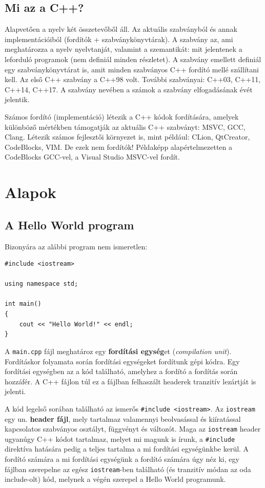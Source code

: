 \documentclass[a4paper,11.5pt,table]{article}
\begin{document}
	\subsection{Mi az a C++?}
	Alapvetően a nyelv két összetevőből áll. Az aktuális szabványból és annak implementációiból (fordítók + szabványkönyvtárak). A szabvány az, ami meghatározza a nyelv nyelvtanját, valamint a szemantikát: mit jelentenek a leforduló programok (nem definiál minden részletet). A szabvány emellett definiál egy szabványkönyvtárat is, amit minden szabványos C++ fordító mellé szállítani kell. Az első C++ szabvány a {C++98} volt. További szabványai: {C++03}, {C++11}, {C++14}, {C++17}. A szabvány nevében a számok a szabvány elfogadásának évét jelentik. 
	
	\medskip
	Számos fordító (implementáció) létezik a C++ kódok fordítására, amelyek különböző mértékben támogatják az aktuális C++ szabványt: MSVC, GCC, Clang.
	Létezik számos fejlesztői környezet is, mint például: CLion, QtCreator, CodeBlocks, VIM. De ezek nem fordítók! Példaképp alapértelmezetten a CodeBlocks GCC-vel, a Visual Studio MSVC-vel fordít.


	\section{Alapok}

	\subsection{A Hello World program}
	Bizonyára az alábbi program nem ismeretlen:
	
	\medskip
	
	\begin{lstlisting}
#include <iostream>

using namespace std;
	
int main()
{
	cout << "Hello World!" << endl;
}
	\end{lstlisting}
	A \texttt{main.cpp} fájl meghatároz egy \textbf{fordítási egység}et (\textit{compilation unit}). Fordításkor folyamata során fordítási egységeket fordítunk gépi kódra. Egy fordítási egységben az a kód található, amelyhez a fordító a fordítás során hozzáfér. A C++ fájlon túl ez a fájlban felhaszált headerek tranzitív lezártját is jelenti.
	
	\medskip
	A kód legelső sorában található az ismerős \texttt{\#include <iostream>}. Az \texttt{iostream} egy un. \textbf{header fájl}, mely tartalmaz valamennyi beolvasással és kiíratással kapcsolatos szabványos osztályt, függvényt és változót. Maga az \texttt{iostream} header ugyanúgy C++ kódot tartalmaz, melyet mi magunk is írunk, a \texttt{\#include} direktíva hatására pedig a teljes tartalma a mi fordítási egységünkbe kerül. A fordító számára a mi fordítási egységünk a fordító számára úgy néz ki, egy fájlban szerepelne az egész \texttt{iostream}-ben található (és tranzitív módan az oda include-olt) kód, melynek a végén szerepel a Hello World programunk.
	
\end{document}
